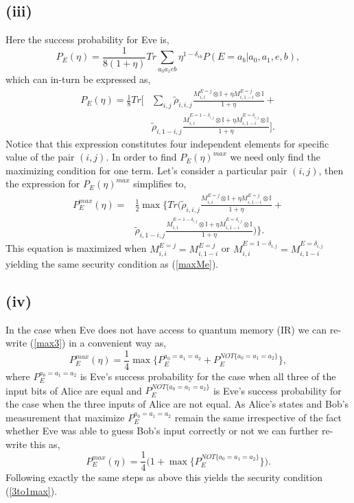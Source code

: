\subsection*{(iii)}
Here the success probability for Eve is,
\begin{equation}
P_E(\eta)= \frac{1}{8(1+\eta)}Tr \sum_{a_0a_1eb} \eta^{1-\delta_{eb}}P(E=a_b|a_0,a_1,e,b),
\end{equation}
which can in-turn be expressed as,
\begin{equation}
\begin{split}
P_E(\eta)= \frac{1}{8} Tr\bigg[ & \sum_{i,j} \tilde{\rho}_{i,i,j} \frac{M_{i,i}^{E=j} \otimes \mathbb{I} + \eta M_{i,1-i}^{E=j} \otimes \mathbb{I} }{1 + \eta} + \\ & \tilde{\rho}_{i,1-i,j} \frac{M_{i,i}^{E=1-\delta_{i,j}} \otimes \mathbb{I} + \eta M_{i,1-i}^{E=\delta_{i,j}} \otimes \mathbb{I} }{1 + \eta} \bigg].
\end{split}
\end{equation}
Notice that this expression constitutes four independent elements  for specific value of the pair $(i,j)$. In order to find $P_E(\eta)^{max}$ we need only find the maximizing condition for one term. Let's consider a particular pair $(i,j)$, then the expression for $P_E(\eta)^{max}$ simplifies to,
\begin{equation}
\begin{split}
P_E^{max}(\eta)= & \frac{1}{2} \max \bigg\{ Tr\bigg(  \tilde{\rho}_{i,i,j} \frac{M_{i,i}^{E=j} \otimes \mathbb{I} + \eta M_{i,1-i}^{E=j} \otimes \mathbb{I} }{1 + \eta} + \\ & \tilde{\rho}_{i,1-i,j} \frac{M_{i,i}^{E=1-\delta_{i,j}} \otimes \mathbb{I} + \eta M_{i,1-i}^{E=\delta_{i,j}} \otimes \mathbb{I} }{1 + \eta} \bigg) \bigg\}.
\end{split}
\end{equation}
This equation is maximized when $M_{i,i}^{E=j}=M_{i,1-i}^{E=j}$ or $M_{i,i}^{E=1-\delta_{i,j}}=M_{i,1-i}^{E=\delta_{i,j}}$ yielding the same security condition as (\ref{maxMe}).
\subsection*{(iv)}
In the case when Eve does not have access to quantum memory (IR) we can re-write (\ref{max3}) in a convenient way as,
\begin{equation}
P_E^{max}(\eta)=\frac{1}{4}\max \bigg\{P_E^{a_0=a_1=a_2} + P_E^{NOT\{a_0=a_1=a_2\}} \bigg\},
\end{equation}
where $P_E^{a_0=a_1=a_2}$ is Eve's success probability for the case when all three of the input bits of Alice are equal and $P_E^{NOT\{a_0=a_1=a_2\} }$ is Eve's success probability for the case when the three inputs of Alice are not equal. As Alice's states and Bob's measurement that maximize $P_E^{a_0=a_1=a_2}$ remain the same irrespective of the fact whether Eve was able to guess Bob's input correctly or not we can further re-write this as,
\begin{equation}
P_E^{max}(\eta)=\frac{1}{4}\bigg( 1 + \max \bigg\{P_E^{NOT\{a_0=a_1=a_2\}} \bigg\} \bigg).
\end{equation}
Following exactly the same steps as above this yields the security condition (\ref{3to1max}).
